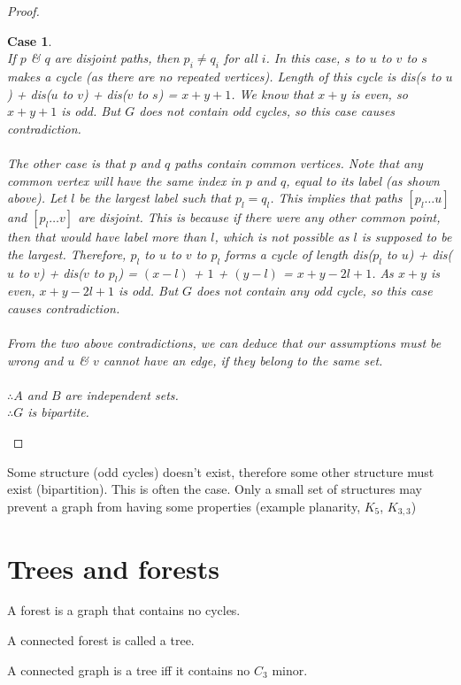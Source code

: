 \documentclass{article}
\newtheorem{case}{Case}
\begin{document}
\begin{proof}
\begin{case}
        \\
        If $p$ \& $q$ are disjoint paths, then $p_{i}\ne q_{i}$ for all $i$. In this case, $s$ to $u$ to $v$ to $s$ makes a cycle (as there are no repeated vertices). Length of this cycle is dis($s$ to $u$) + dis($u$ to $v$) + dis($v$ to $s$) = $x+y+1$. We know that $x+y$ is even, so $x+y+1$ is odd. But $G$ does not contain odd cycles, so this case causes contradiction.\\
        \\
        The other case is that $p$ and $q$ paths contain common vertices. Note that any common vertex will have the same index in $p$ and $q$, equal to its label (as shown above). Let $l$ be the largest label such that $p_{l}=q_{l}$. This implies that paths $[p_{l} \dots u]$ and $[p_{l} \dots v]$ are disjoint. This is because if there were any other common point, then that would have label more than $l$, which is not possible as $l$ is supposed to be the largest. Therefore, $p_{l}$ to $u$ to $v$ to $p_{l}$ forms a cycle of length dis($p_{l}$ to $u$) + dis($u$ to $v$) + dis($v$ to $p_{l}$) = $(x-l)$ + $1$ + $(y-l)$ = $x+y-2l+1$. As $x+y$ is even, $x+y-2l+1$ is odd. But $G$ does not contain any odd cycle, so this case causes contradiction.\\
        \\
        From the two above contradictions, we can deduce that our assumptions must be wrong and $u$ \& $v$ cannot have an edge, if they belong to the same set.\\
        \\
        $\therefore A$ and $B$ are independent sets.\\
        $\therefore G$ is bipartite.
    \end{case}
\end{proof}

Some structure (odd cycles) doesn't exist, therefore some other structure must exist (bipartition). This is often the case. Only a small set of structures may prevent a graph from having some properties (example planarity, $K_{5}$, $K_{3,3}$)
  
\section{Trees and forests}
\begin{definition}
    A forest is a graph that contains no cycles.
\end{definition}
\begin{definition}
    A connected forest is called a tree.
\end{definition}
\begin{theorem}
    A connected graph is a tree iff it contains no {$C_3$} minor.
\end{theorem}
\end{document}
